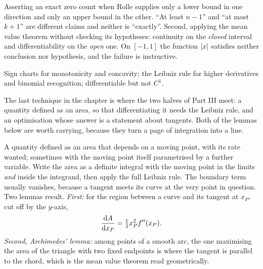 \begin{trap}
Asserting an exact zero count when Rolle supplies only a lower bound in one direction and only an upper bound in the other. ``At least $n-1$'' and ``at most $k+1$'' are different claims and neither is ``exactly''. Second, applying the mean value theorem without checking its hypotheses: continuity on the \emph{closed} interval and differentiability on the \emph{open} one. On $[-1,1]$ the function $\left\lvert x\right\rvert$ satisfies neither conclusion nor hypothesis, and the failure is instructive.
\end{trap}

\begin{seealsob}Sign charts for monotonicity and concavity; the Leibniz rule for higher derivatives and binomial recognition; differentiable but not $C^{1}$.\end{seealsob}

The last technique in the chapter is where the two halves of Part III meet: a quantity defined as an area, so that differentiating it needs the Leibniz rule, and an optimisation whose answer is a statement about tangents. Both of the lemmas below are worth carrying, because they turn a page of integration into a line.

\cue A quantity defined as an area that depends on a moving point, with its rate wanted; sometimes with the moving point itself parametrised by a further variable.
\method Write the area as a definite integral with the moving point in the limits \emph{and} inside the integrand, then apply the full Leibniz rule. The boundary term usually vanishes, because a tangent meets its curve at the very point in question. Two lemmas result. \emph{First:} for the region between a curve and its tangent at $x_{P}$, cut off by the $y$-axis,
\[
\frac{\mathrm{d}A}{\mathrm{d}x_{P}}=\tfrac12x_{P}^{2}f''(x_{P}) .
\]
\emph{Second, Archimedes' lemma:} among points of a smooth arc, the one maximising the area of the triangle with two fixed endpoints is where the tangent is parallel to the chord, which is the mean value theorem read geometrically.

